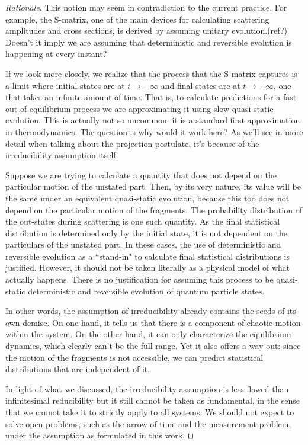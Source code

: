 \documentclass[smallextended]{svjour3}
\numberwithin{equation}{section}
\newenvironment{rationale}{\emph{Rationale}.}{\hfill\(\qed\)}
\theoremstyle{definition}
\newenvironment{rationale}{\emph{Rationale}.}{\qed}
\begin{document}
\begin{rationale}
	This notion may seem in contradiction to the current practice. For example, the S-matrix, one of the main devices for calculating scattering amplitudes and cross sections, is derived by assuming unitary evolution.(ref?) Doesn't it imply we are assuming that deterministic and reversible evolution is happening at every instant?
	
	If we look more closely, we realize that the process that the S-matrix captures is a limit where initial states are at $t \rightarrow - \infty$ and final states are at $t \rightarrow + \infty$, one that takes an infinite amount of time.  That is, to calculate predictions for a fast out of equilibrium process we are approximating it using slow quasi-static evolution. This is actually not so uncommon: it is a standard first approximation in thermodynamics. The question is why would it work here? As we'll see in more detail when talking about the projection postulate, it's because of the irreducibility assumption itself.
	
	Suppose we are trying to calculate a quantity that does not depend on the particular motion of the unstated part. Then, by its very nature, its value will be the same under an equivalent quasi-static evolution, because this too does not depend on the particular motion of the fragments. The probability distribution of the out-states during scattering is one such quantity. As the final statistical distribution is determined only by the initial state, it is not dependent on the particulars of the unstated part. In these cases, the use of deterministic and reversible evolution as a ``stand-in" to calculate final statistical distributions is justified. However, it should not be taken literally as a physical model of what actually happens. There is no justification for assuming this process to be quasi-static deterministic and reversible evolution of quantum particle states.
	
	In other words, the assumption of irreducibility already contains the seeds of its own demise. On one hand, it tells us that there is a component of chaotic motion within the system. On the other hand, it can only characterize the equilibrium dynamics, which clearly can't be the full range. Yet it also offers a way out: since the motion of the fragments is not accessible, we can predict statistical distributions that are independent of it.
	
	In light of what we discussed, the irreducibility assumption is less flawed than infinitesimal reducibility but it still cannot be taken as fundamental, in the sense that we cannot take it to strictly apply to all systems. We should not expect to solve open problems, such as the arrow of time and the measurement problem, under the assumption as formulated in this work.
\end{rationale}
\end{document}
